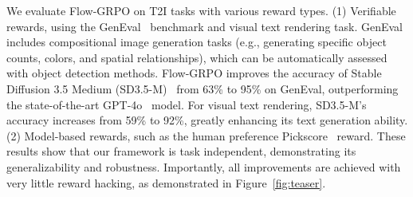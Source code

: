 We evaluate Flow-GRPO on T2I tasks with various reward types. (1) Verifiable rewards, using the GenEval~\cite{geneval} benchmark and visual text rendering task. GenEval includes compositional image generation tasks (e.g., generating specific object counts, colors, and spatial relationships), which can be automatically assessed with object detection methods. Flow-GRPO improves the accuracy of Stable Diffusion 3.5 Medium (SD3.5-M)~\cite{sd3} from 63\% to 95\% on GenEval, outperforming the state-of-the-art GPT-4o~\cite{gpt4o} model. For visual text rendering, SD3.5-M’s accuracy increases from 59\% to 92\%, greatly enhancing its text generation ability. (2) Model-based rewards, such as the human preference Pickscore~\cite{kirstain2023pick} reward. These results show that our framework is task independent, demonstrating its generalizability and robustness. Importantly, all improvements are achieved with very little reward hacking, as demonstrated in Figure~\ref{fig:teaser}.

